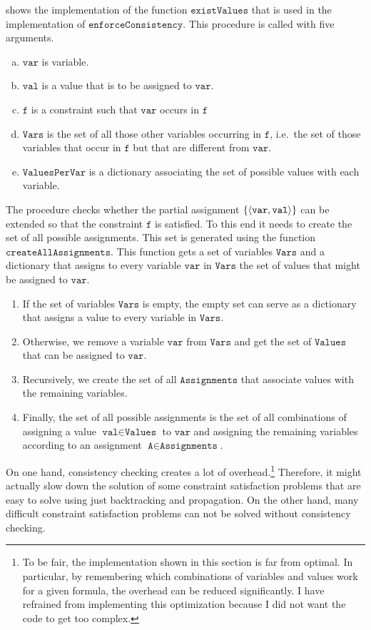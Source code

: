 \noindent
{} shows the implementation of the function $\texttt{existValues}$ that
is used in the implementation of $\texttt{enforceConsistency}$.  This procedure is called with five arguments.
\begin{enumerate}[(a)]
\item $\texttt{var}$ is variable.
\item $\texttt{val}$ is a value that is to be assigned to $\texttt{var}$.
\item $\texttt{f}$ is a constraint such that $\texttt{var}$ occurs in $\texttt{f}$
\item $\texttt{Vars}$ is the set of all those other variables occurring in $\texttt{f}$, i.e.~the set of those
      variables that occur in $\texttt{f}$ but that are different from $\texttt{var}$. 
\item $\texttt{ValuesPerVar}$  is a dictionary associating the set of possible values with each variable.
\end{enumerate}
The procedure checks whether the partial assignment $\{ \pair(\texttt{var}, \texttt{val}) \}$ can be
extended so that the constraint $\texttt{f}$ is satisfied.  To this end it needs to create the set of all
possible assignments.  This set is generated using the function $\texttt{createAllAssignments}$.  This function
gets a set of variables $\texttt{Vars}$ and a dictionary that assigns to every variable $\texttt{var}$ in
$\texttt{Vars}$ the set of values that might be assigned to $\texttt{var}$.
\begin{enumerate}
\item If the set of variables $\texttt{Vars}$ is empty, the empty set can serve as a dictionary that 
      assigns a value to every variable in $\texttt{Vars}$.
\item Otherwise, we remove a variable $\texttt{var}$ from $\texttt{Vars}$ and get the set of $\texttt{Values}$
      that can be assigned to $\texttt{var}$.  
\item Recursively, we create the set of all $\texttt{Assignments}$ that associate values with the remaining 
      variables.
\item Finally, the set of all possible assignments is the set of all combinations of assigning a value 
      $\texttt{val} \in \texttt{Values}$ to $\texttt{var}$ and assigning the remaining variables according to 
      an assignment $\texttt{A} \in \texttt{Assignments}$.
\end{enumerate}
On one hand, consistency checking creates a lot of overhead.\footnote{
  To be fair, the implementation shown in this section is far from optimal.  In particular, by remembering which
  combinations of variables and values work for a given formula, the overhead can be reduced significantly.  I have
  refrained from implementing this optimization because I did not want the code to get too complex.
}
Therefore, it might actually slow down the
solution of some constraint satisfaction problems that are easy to solve using just backtracking and
propagation.  On the other hand, many difficult constraint satisfaction problems can not be solved
without consistency checking.

